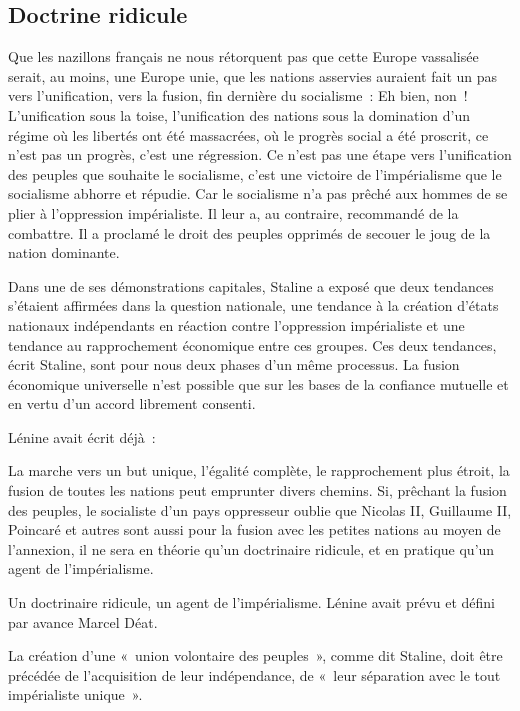 \documentclass[french,twoside]{book} %
\newenvironment{quoteblock}%
  {\begin{quoting}}
  {\end{quoting}}
\newenvironment{quotebar}{%
    \def\FrameCommand{{\color{rubric!10!}\vrule width 0.5em} \hspace{0.9em}}%
    \def\OuterFrameSep{\itemsep} %
    \MakeFramed {\advance\hsize-\width \FrameRestore}
  }%
  {%
    \endMakeFramed
  }
\renewenvironment{quoteblock}%
  {%
    \savenotes
    \setstretch{0.9}
    \normalfont
    \begin{quotebar}
  }
  {%
    \end{quotebar}
    \spewnotes
  }
\begin{document}
\subsection[Doctrine ridicule]{Doctrine ridicule}
\noindent Que les nazillons français ne nous rétorquent pas que cette Europe vassalisée serait, au moins, une Europe unie, que les nations asservies auraient fait un pas vers l’unification, vers la fusion, fin dernière du socialisme : Eh bien, non ! L’unification sous la toise, l’unification des nations sous la domination d’un régime où les libertés ont été massacrées, où le progrès social a été proscrit, ce n’est pas un progrès, c’est une régression. Ce n’est pas une étape vers l’unification des peuples que souhaite le socialisme, c’est une victoire de l’impérialisme que le socialisme abhorre et répudie. Car le socialisme n’a pas prêché aux hommes de se plier à l’oppression impérialiste. Il leur a, au contraire, recommandé de la combattre. Il a proclamé le droit des peuples opprimés de secouer le joug de la nation dominante.\par
Dans une de ses démonstrations capitales, Staline a exposé que deux tendances s’étaient affirmées dans la question nationale, une tendance à la création d’états nationaux indépendants en réaction contre l’oppression impérialiste et une tendance au rapprochement économique entre ces groupes. Ces deux tendances, écrit Staline, sont pour nous deux phases d’un même processus. La fusion économique universelle n’est possible que sur les bases de la confiance mutuelle et en vertu d’un accord librement consenti.\par
Lénine avait écrit déjà :\par

\begin{quoteblock}
 \noindent La marche vers un but unique, l’égalité complète, le rapprochement plus étroit, la fusion de toutes les nations peut emprunter divers chemins. Si, prêchant la fusion des peuples, le socialiste d’un pays oppresseur oublie que Nicolas II, Guillaume II, Poincaré et autres sont aussi pour la fusion avec les petites nations au moyen de l’annexion, il ne sera en théorie qu’un doctrinaire ridicule, et en pratique qu’un agent de l’impérialisme.
 \end{quoteblock}

\noindent Un doctrinaire ridicule, un agent de l’impérialisme. Lénine avait prévu et défini par avance Marcel Déat.\par
La création d’une « union volontaire des peuples », comme dit Staline, doit être précédée de l’acquisition de leur indépendance, de « leur séparation avec le tout impérialiste unique ».
\end{document}
